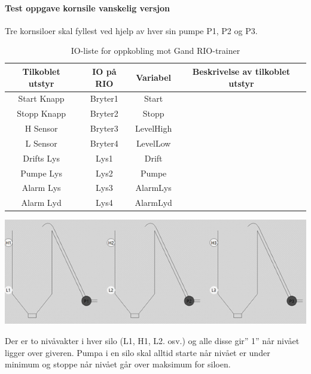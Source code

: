 \paragraph{Test oppgave kornsile vanskelig versjon}

Tre kornsiloer skal fyllest ved hjelp av hver sin pumpe P1, P2 og
P3. 

\begin{table}[]
\begin{centering}
\begin{tabular}{|c|c|c|c|}
\hline 
Tilkoblet utstyr & IO på RIO & Variabel & Beskrivelse av tilkoblet utstyr\tabularnewline
\hline 
\hline 
Start Knapp & Bryter1 & Start & \tabularnewline
\hline 
Stopp Knapp & Bryter2 & Stopp & \tabularnewline
\hline 
H Sensor & Bryter3 & LevelHigh & \tabularnewline
\hline 
L Sensor & Bryter4 & LevelLow & \tabularnewline
\hline 
Drifts Lys & Lys1 & Drift & \tabularnewline
\hline 
Pumpe Lys & Lys2 & Pumpe & \tabularnewline
\hline 
Alarm Lys & Lys3 & AlarmLys & \tabularnewline
\hline 
Alarm Lyd & Lys4 & AlarmLyd & \tabularnewline
\hline 
\end{tabular}
\par\end{centering}
\caption{IO-liste for oppkobling mot Gand RIO-trainer}
\end{table}

\includegraphics[width=1\textwidth]{i08012x02.png}

Der er to nivåvakter i hver silo (L1, H1, L2. osv.) og alle disse
gir\textquotedblright{} 1\textquotedblright{} når nivået ligger over
giveren. Pumpa i en silo skal alltid starte når nivået er under minimum
og stoppe når nivået går over maksimum for siloen.

